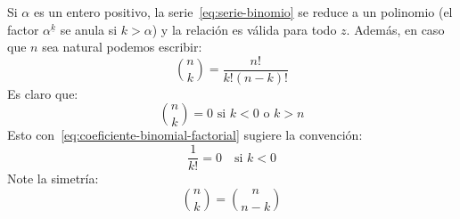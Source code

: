   Si \(\alpha\) es un entero positivo,
  la serie~\eqref{eq:serie-binomio} se reduce a un polinomio
  (el factor \(\alpha^{\underline{k}}\) se anula si \(k > \alpha\))
  y la relación es válida para todo \(z\).
  Además,
  en caso que \(n\) sea natural podemos escribir:
  \begin{equation}
    \label{eq:coeficiente-binomial-factorial}
    \binom{n}{k}
       = \frac{n!}{k! (n - k)!}
  \end{equation}
  Es claro que:
  \begin{equation}
    \label{eq:coeficiente-binomial-contorno}
    \binom{n}{k}
      = 0 \text{\ si \(k < 0\) o \(k > n\)}
  \end{equation}
  Esto con~\eqref{eq:coeficiente-binomial-factorial}
  sugiere la convención:
  \begin{equation}
    \label{eq:1/k!-convention}
    \frac{1}{k!}
      = 0 \quad \text{si \(k < 0\)}
  \end{equation}
  Note la simetría:
  \begin{equation}
    \label{eq:coeficiente-binomial-simetria}
    \binom{n}{k}
      = \binom{n}{n - k}
  \end{equation}

